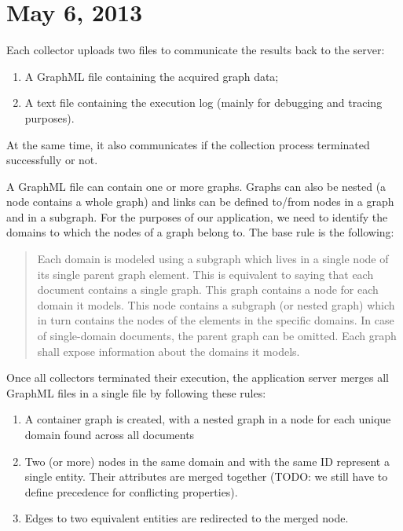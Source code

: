 \section{May 6, 2013}

Each collector uploads two files to communicate the results back to the server:
\begin{enumerate}
    \item A GraphML file containing the acquired graph data;
    \item A text file containing the execution log (mainly for debugging and tracing purposes).
\end{enumerate}

At the same time, it also communicates if the collection process terminated successfully or not.

A GraphML file can contain one or more graphs. Graphs can also be nested (\ie a node contains a whole graph) and links can be defined to/from nodes in a graph and in a subgraph. For the purposes of our application, we need to identify the domains to which the nodes of a graph belong to. The base rule is the following:

\begin{quote}
    Each domain is modeled using a subgraph which lives in a single node of its single parent graph element. This is equivalent to saying that each document contains a single graph. This graph contains a node for each domain it models. This node contains a subgraph (or nested graph) which in turn contains the nodes of the elements in the specific domains. In case of single-domain documents, the parent graph can be omitted. Each graph shall expose information about the domains it models.
\end{quote}

Once all collectors terminated their execution, the application server merges all GraphML files in a single file by following these rules:

\begin{enumerate}
    \item A container graph is created, with a nested graph in a node for each unique domain found across all documents
    \item Two (or more) nodes in the same domain and with the same ID represent a single entity. Their attributes are merged together (TODO: we still have to define precedence for conflicting properties).
    \item Edges to two equivalent entities are redirected to the merged node.
\end{enumerate}

